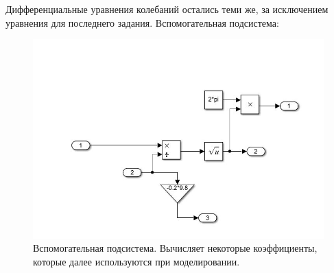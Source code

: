 \documentclass{article}
\begin{document}
	Дифференциальные уравнения колебаний остались теми же, за исключением уравнения для последнего задания.
	Вспомогательная подсистема:
	\begin{figure}[H]
		\centering
		\includegraphics[width=0.7\linewidth]{koef}
		\caption{Вспомогательная подсистема. Вычисляет некоторые коэффициенты, которые далее используются при моделировании.}
		\label{fig:koef}
	\end{figure}
\end{document}
